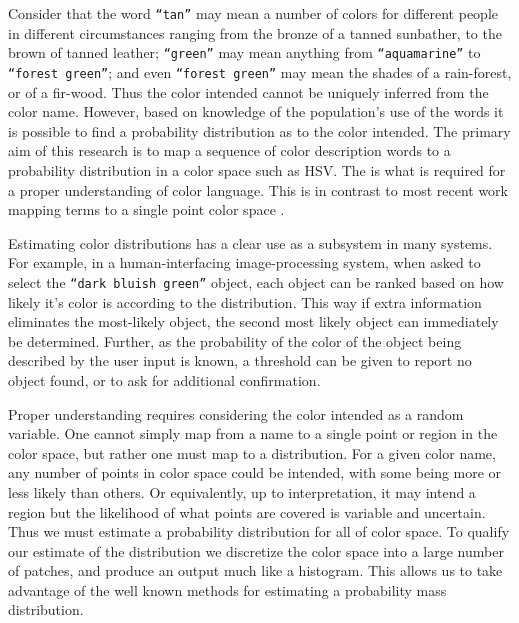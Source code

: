 \documentclass[11pt,letterpaper]{article}
\newcommand{\parencite}{\cite}
\begin{document}
Consider that the word \texttt{``tan''} may mean a number of colors for different people in different circumstances ranging from the bronze of a tanned sunbather, to the brown of tanned leather;
\texttt{``green''} may mean anything from \texttt{``aquamarine''} to \texttt{``forest green''};
 and even \texttt{``forest green''} may mean the shades of a rain-forest, or of a fir-wood.
Thus the color intended cannot be uniquely inferred from the color name.
However, based on knowledge of the population's use of the words  it is possible to find a probability distribution as to the color intended.
The primary aim of this research is to map a sequence of color description words to a probability distribution in a color space such as HSV.
The is what is required for a proper understanding of color language.
This is in contrast to most recent work mapping terms to a single point color space \parencite{DBLP:journals/corr/KawakamiDRS16}.


Estimating color distributions has a clear use as a subsystem in many systems.
For example, in a human-interfacing image-processing system, when asked to select the \texttt{``dark bluish green''} object, each object can be ranked based on how likely it's color is according to the distribution.
This way if extra information eliminates the most-likely object, the second most likely object can immediately be determined.
Further, as the probability of the color of the object being described by the user input is known, a threshold can be given to report no object found, or to ask for additional confirmation.


Proper understanding requires considering the color intended as a random variable.
One cannot simply map from a name to a single point or region in the color space, but rather one must map to a distribution.
For a given color name, any number of points in color space could be intended, with some being more or less likely than others.
Or equivalently, up to interpretation, it may intend a region but the likelihood of what points are covered is variable and uncertain.
Thus we must estimate a probability distribution for all of color space.
To qualify our estimate of the distribution we discretize the color space into a large number of patches, and produce an output much like a histogram.
This allows us to take advantage of the well known methods for estimating a probability mass distribution.
\end{document}
